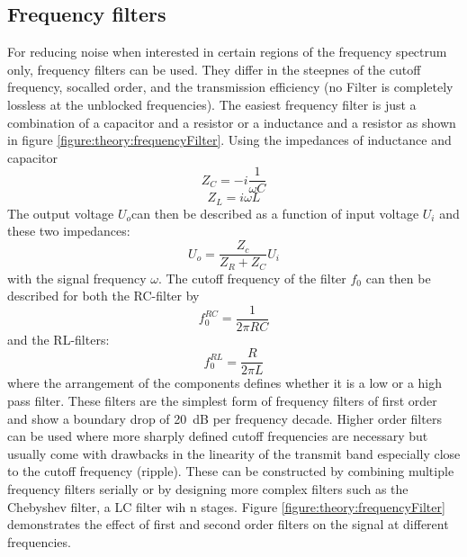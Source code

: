             \subsection{Frequency filters}
            For reducing noise when interested in certain regions of the frequency spectrum only, frequency filters can be used. They differ in the steepnes of the cutoff frequency, socalled order, and the transmission efficiency (no Filter is completely lossless at the unblocked frequencies). The easiest frequency filter is just a combination of a capacitor and a resistor or a inductance and a resistor as shown in figure \ref{figure:theory:frequencyFilter}. Using the impedances of inductance and capacitor
                \begin{equation*}
                    Z_C = -i\frac{1}{\omega C}
                \end{equation*}
                \begin{equation*}
                    Z_L = {i\omega L}
                \end{equation*} 
                The output voltage $U_o$can then be described as a function of input voltage $U_{i}$ and these two impedances:
                \begin{equation}
                    U_o = \frac{Z_c}{Z_R + Z_C} U_i
                \end{equation}
                with the signal frequency $\omega$. The cutoff frequency of the filter $f_0$ can then be described for both the RC-filter by
                \begin{equation}
                    f_0^{RC} = \frac{1}{2\pi R C}
                \end{equation}
                and the RL-filters:
                \begin{equation}
                    f_0^{RL} = \frac{R}{2\pi L}
                \end{equation}
                where the arrangement of the components defines whether it is a low or a high pass filter. These filters are the simplest form of frequency filters of first order and show a boundary drop of \SI{20}{\deci\bel} per frequency decade. Higher order filters can be used where more sharply defined cutoff frequencies are necessary but usually come with drawbacks in the linearity of the transmit band especially close to the cutoff frequency (ripple). These can be constructed by combining multiple frequency filters serially or by designing more complex filters such as the Chebyshev filter, a LC filter wih n stages. Figure \ref{figure:theory:frequencyFilter} demonstrates the effect of first and second order filters on the signal at different frequencies.
